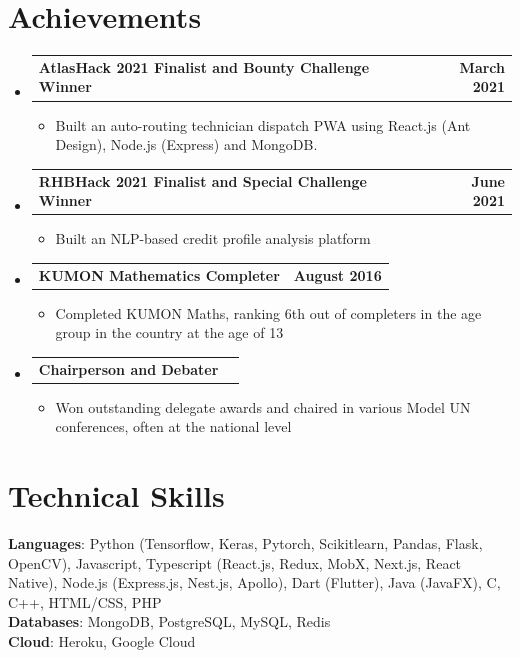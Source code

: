 \documentclass[letterpaper,12pt]{article}
\makeatletter
\newcommand{\resumeItem}[1]{
  \item\small{
    {#1 \vspace{-2pt}}
  }
}
\newcommand{\resumeProjectHeading}[2]{
    \item
    \begin{tabular*}{1.001\textwidth}{l@{\extracolsep{\fill}}r}
      \small#1 & \textbf{\small #2}\\
    \end{tabular*}\vspace{-7pt}
}
\newcommand{\resumeSubHeadingListStart}{\begin{itemize}[leftmargin=0.0in, label={}]}
\newcommand{\resumeSubHeadingListEnd}{\end{itemize}}
\newcommand{\resumeItemListStart}{\begin{itemize}}
\newcommand{\resumeItemListEnd}{\end{itemize}\vspace{-5pt}}
\makeatother
\begin{document}
\section{Achievements}
    \vspace{-5pt}
    \resumeSubHeadingListStart
      \resumeProjectHeading
          {\textbf{AtlasHack 2021 Finalist and Bounty Challenge Winner}}{March 2021}
          \resumeItemListStart
            \resumeItem{Built an auto-routing technician dispatch PWA using React.js (Ant Design), Node.js (Express) and MongoDB.}
          \resumeItemListEnd
          \vspace{-20pt}
      \resumeProjectHeading
          {\textbf{RHBHack 2021 Finalist and Special Challenge Winner}}{June 2021}
          \resumeItemListStart
            \resumeItem{Built an NLP-based credit profile analysis platform}
          \resumeItemListEnd
          \vspace{-20pt}
      \resumeProjectHeading
          {\textbf{KUMON Mathematics Completer}}{August 2016}
          \resumeItemListStart
            \resumeItem{Completed KUMON Maths, ranking 6th out of completers in the age group in the country at the
            age of 13}
          \resumeItemListEnd
          \vspace{-20pt}
          \resumeProjectHeading
          {\textbf{Chairperson and Debater}}{}
          \resumeItemListStart
            \resumeItem{Won outstanding delegate awards and chaired in various Model UN conferences, often at the national level}
          \resumeItemListEnd
          \vspace{-2pt}
    \resumeSubHeadingListEnd
\vspace{-15pt}

%
\section{Technical Skills}
 \begin{itemize}[leftmargin=0.15in, label={}]
    \small{\item{
     \textbf{Languages}{: Python (Tensorflow, Keras, Pytorch, Scikitlearn, Pandas, Flask, OpenCV), Javascript, Typescript (React.js, Redux, MobX, Next.js, React Native), Node.js (Express.js, Nest.js, Apollo), Dart (Flutter), Java (JavaFX), C, C++, HTML/CSS, PHP} \\
     \textbf{Databases}{: MongoDB, PostgreSQL, MySQL, Redis} \\
     \textbf{Cloud}{: Heroku, Google Cloud} \\
    }}
 \end{itemize}
 \vspace{-16pt}
\end{document}
